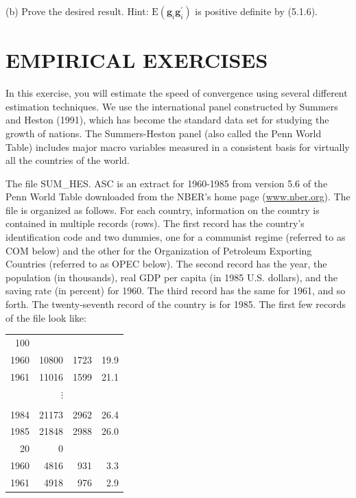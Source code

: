 \documentclass[10pt]{article}
\begin{document}
(b) Prove the desired result. Hint: $\mathrm{E}\left(\mathbf{g}_{i} \mathbf{g}_{i}^{\prime}\right)$ is positive definite by (5.1.6).

\section*{EMPIRICAL EXERCISES}
In this exercise, you will estimate the speed of convergence using several different estimation techniques. We use the international panel constructed by Summers and Heston (1991), which has become the standard data set for studying the growth of nations. The Summers-Heston panel (also called the Penn World Table) includes major macro variables measured in a consistent basis for virtually all the countries of the world.

The file SUM\_HES. ASC is an extract for 1960-1985 from version 5.6 of the Penn World Table downloaded from the NBER's home page (\href{http://www.nber.org}{www.nber.org}). The\\
file is organized as follows. For each country, information on the country is contained in multiple records (rows). The first record has the country's identification code and two dummies, one for a communist regime (referred to as COM below) and the other for the Organization of Petroleum Exporting Countries (referred to as OPEC below). The second record has the year, the population (in thousands), real GDP per capita (in 1985 U.S. dollars), and the saving rate (in percent) for 1960. The third record has the same for 1961, and so forth. The twenty-seventh record of the country is for 1985. The first few records of the file look like:

\begin{center}
\begin{tabular}{rrrr}
100 &  &  &  \\
1960 & 10800 & 1723 & 19.9 \\
1961 & 11016 & 1599 & 21.1 \\
 & $\vdots$ &  &  \\
 &  &  &  \\
1984 & 21173 & 2962 & 26.4 \\
1985 & 21848 & 2988 & 26.0 \\
20 & 0 &  &  \\
1960 & 4816 & 931 & 3.3 \\
1961 & 4918 & 976 & 2.9 \\
\end{tabular}
\end{center}
\end{document}
